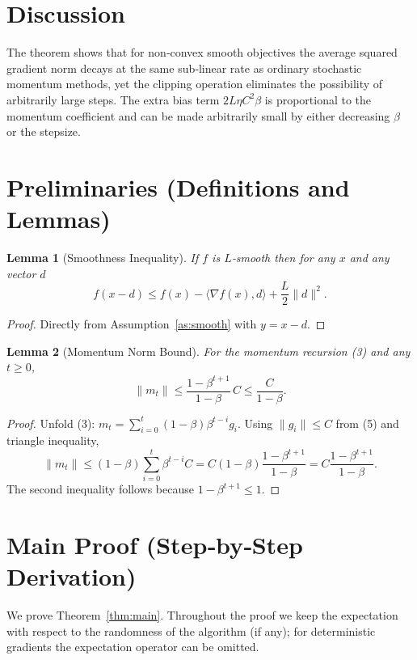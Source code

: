 \documentclass{article}
\newtheorem{lemma}{Lemma}
\begin{document}
\section*{Discussion}
The theorem shows that for non‑convex smooth objectives the average
squared gradient norm decays at the same sub‑linear rate as ordinary
stochastic momentum methods, yet the clipping operation eliminates the
possibility of arbitrarily large steps. The extra bias term
$2L\eta C^2\beta$ is proportional to the momentum coefficient and can be
made arbitrarily small by either decreasing $\beta$ or the stepsize.

\section*{Preliminaries (Definitions and Lemmas)}
\begin{lemma}[Smoothness Inequality]\label{lem:smooth}
If $f$ is $L$‑smooth then for any $x$ and any vector $d$
\[
f(x-d)\le f(x)-\langle\nabla f(x),d\rangle+\frac{L}{2}\|d\|^2 .
\]
\end{lemma}
\begin{proof}
Directly from Assumption~\ref{as:smooth} with $y=x-d$.
\end{proof}

\begin{lemma}[Momentum Norm Bound]\label{lem:mombound}
For the momentum recursion (3) and any $t\ge0$,
\[
\|m_t\|\le \frac{1-\beta^{t+1}}{1-\beta}\,C\le\frac{C}{1-\beta}.
\tag{8}
\]
\end{lemma}
\begin{proof}
Unfold (3):
$m_t=\sum_{i=0}^{t}(1-\beta)\beta^{t-i}g_i$.
Using $\|g_i\|\le C$ from (5) and triangle inequality,
\[
\|m_t\|\le (1-\beta)\sum_{i=0}^{t}\beta^{t-i}C
=C(1-\beta)\frac{1-\beta^{t+1}}{1-\beta}=C\frac{1-\beta^{t+1}}{1-\beta}.
\]
The second inequality follows because $1-\beta^{t+1}\le1$.
\end{proof}

\section*{Main Proof (Step‑by‑Step Derivation)}
We prove Theorem~\ref{thm:main}.  Throughout the proof we keep the
expectation with respect to the randomness of the algorithm (if any);
for deterministic gradients the expectation operator can be omitted.
\end{document}
